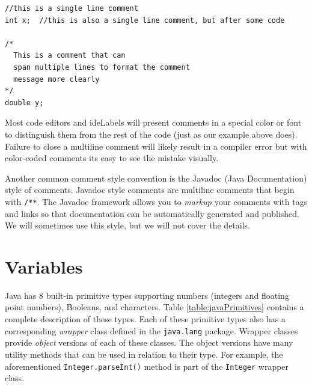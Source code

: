 \begin{verbatim}
//this is a single line comment
int x;  //this is also a single line comment, but after some code

/*
  This is a comment that can 
  span multiple lines to format the comment
  message more clearly
*/
double y;
\end{verbatim}

Most code editors and \glspl{ideLabel} will present comments in a special color or
font to distinguish them from the rest of the code (just as our example above does).
Failure to close a multiline comment will likely result in a compiler error but with
color-coded comments its easy to see the mistake visually.

Another common comment style convention is the Javadoc (Java Documentation)
style of comments.  Javadoc style comments are multiline comments that begin
with \texttt{/**}.  The Javadoc framework allows you
to \emph{markup} your comments with tags and links so that documentation can
be automatically generated and published.  We will sometimes use this style, but
we will not cover the details.  

\section{Variables}

Java has 8 built-in \gls{primitive} types supporting numbers (integers 
and floating point numbers), Booleans, and characters.  Table \ref{table:javaPrimitives}
contains a complete description of these types.  Each of these primitive
types also has a corresponding \emph{wrapper} class defined in the 
\texttt{java.lang} package.  Wrapper classes provide \emph{object}
versions of each of these classes.  The object versions have many utility
methods that can be used in relation to their type.  For example, the
aforementioned \texttt{Integer.parseInt()} method is part of the 
\texttt{Integer} wrapper class.


